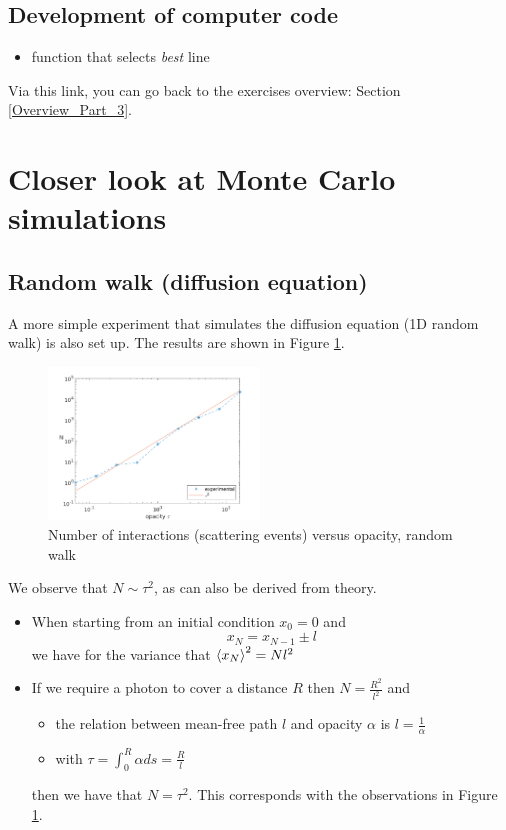 \documentclass[../main/main.tex]{subfiles}
\begin{document}
\subsection{Development of computer code}
\begin{itemize}
\item function that selects \textit{best} line
\end{itemize}


\vspace{0.7cm}
Via this link, you can go back to the exercises overview: Section \underline{\ref{Overview_Part_3}}.


\newpage
\section{Closer look at Monte Carlo simulations}
\label{diffusion_Monte_Carlo_mean_free_path}

\subsection{Random walk (diffusion equation)} A more simple experiment that simulates the diffusion equation (1D random walk) is also set up. The results are shown in Figure \ref{random_walk_N_vs_tau}.
	\begin{figure}[!htp]
	\centering
	\includegraphics[width=0.5\textwidth]{../../introductory_exercises/limb_darkening/data/diff_N_vs_opacity.png}
	\caption{Number of interactions (scattering events) versus 	opacity, random walk}
	\label{random_walk_N_vs_tau}
	\end{figure}
We observe that $N \sim \tau^2$, as can also be derived from theory.

\begin{itemize}
\item When starting from an initial condition $x_0 = 0$ and 
\begin{equation}
x_N = x_{N-1} \pm l
\end{equation}
we have for the variance that $\braket{x_N}^2 = N l^2$ 
\item If we require a photon to cover a distance $R$ then $N = \frac{R^2}{l^2}$ and
\begin{itemize}
\item the relation between mean-free path $l$ and opacity $\alpha$ is $l = \frac{1}{\alpha}$
\item with $\tau = \int_0^R \alpha ds = \frac{R}{l}$
\end{itemize}
then we have that $N = \tau^2$. This corresponds with the observations in Figure \ref{random_walk_N_vs_tau}.
\end{itemize}
\end{document}
